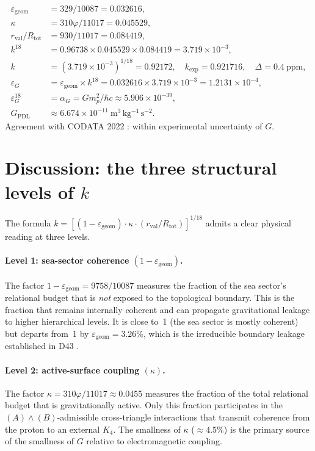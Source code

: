 \documentclass[12pt,a4paper]{article}
\theoremstyle{plain}
\theoremstyle{definition}
\theoremstyle{remark}
\newenvironment{epsbox}[1][]{%
\begin{tcolorbox}[epsstyle,title={Key Result\ifx\relax#1\relax\else: #1\fi}]}{\end{tcolorbox}}
\newcommand{\Kfour}{K_4}
\newcommand{\vp}{\varphi}
\newcommand{\kap}{\kappa}
\newcommand{\rval}{r_{\mathrm{val}}}
\newcommand{\Rtot}{R_{\mathrm{tot}}}
\newcommand{\egeom}{\varepsilon_{\mathrm{geom}}}
\newcommand{\eG}{\varepsilon_G}
\begin{document}
\begin{epsbox}[Numerical verification of the full chain]
\label{box:numerical}
\begin{align*}
\egeom &= 329/10087 = 0.032616,\\
\kap &= 310\vp/11017 = 0.045529,\\
\rval/\Rtot &= 930/11017 = 0.084419,\\
k^{18} &= 0.96738\times 0.045529\times 0.084419 = 3.719\times 10^{-3},\\
k &= (3.719\times 10^{-3})^{1/18} = 0.92172,\quad k_{\exp} = 0.921716,\quad \Delta = 0.4~\mathrm{ppm},\\
\eG &= \egeom\times k^{18} = 0.032616\times 3.719\times 10^{-3} = 1.2131\times 10^{-4},\\
\eG^{18} &= \alpha_G = Gm_p^2/\hbar c \approx 5.906\times 10^{-39},\\
G_{\mathrm{PDL}} &\approx 6.674\times 10^{-11}~\mathrm{m^3\,kg^{-1}\,s^{-2}}.
\end{align*}
Agreement with CODATA 2022 \citep{CODATA2022}: within experimental uncertainty of $G$.
\end{epsbox}  

\section{Discussion: the three structural levels of \texorpdfstring{$k$}{k}}
\label{sec:discussion}

The formula $k = [(1-\egeom)\cdot\kap\cdot(\rval/\Rtot)]^{1/18}$ admits a clear physical reading at three levels.

\paragraph{Level 1: sea-sector coherence $(1-\egeom)$.} The factor $1-\egeom = 9758/10087$ measures the fraction of the sea sector's relational budget that is \emph{not} exposed to the topological boundary. This is the fraction that remains internally coherent and can propagate gravitational leakage to higher hierarchical levels. It is close to~1 (the sea sector is mostly coherent) but departs from~1 by $\egeom = 3.26\%$, which is the irreducible boundary leakage established in D43 \citep{D43}.

\paragraph{Level 2: active-surface coupling $(\kap)$.} The factor $\kap = 310\vp/11017 \approx 0.0455$ measures the fraction of the total relational budget that is gravitationally active. Only this fraction participates in the $(A)\wedge(B)$-admissible cross-triangle interactions that transmit coherence from the proton to an external $\Kfour$. The smallness of $\kap$ ($\approx 4.5\%$) is the primary source of the smallness of $G$ relative to electromagnetic coupling.
\end{document}
